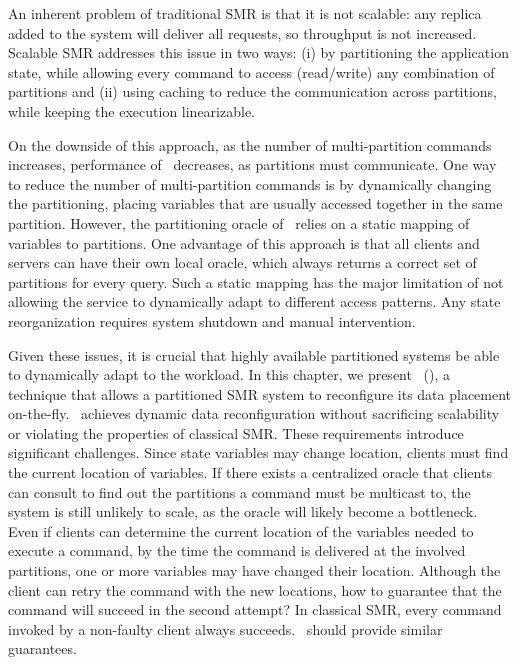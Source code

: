 
An inherent problem of traditional SMR is that it is not scalable: any replica
added to the system will deliver all requests, so throughput is not increased.
Scalable SMR addresses this issue in two ways: (i) by partitioning the
application state, while allowing every command to access (read/write) any
combination of partitions and (ii) using caching to reduce the communication
across partitions, while keeping the execution linearizable.

On the downside of this approach, as the number of multi-partition commands
increases, performance of \ssmr\ decreases, as partitions must communicate.
One way to reduce the number of multi-partition commands is by dynamically
changing the partitioning, placing variables that are usually accessed together
in the same partition. However, the partitioning oracle of \ssmr\ relies on a
static mapping of variables to partitions. One advantage of this approach
is that all clients and servers can have their own local oracle, which always
returns a correct set of partitions for every query. Such a static mapping has
the major limitation of not allowing the service to dynamically adapt to
different access patterns. Any state reorganization requires system shutdown and
manual intervention.

Given these issues, it is crucial that highly available partitioned systems be
able to dynamically adapt to the workload. In this chapter, we present
\dssmrlong\ (\dssmr), a technique that allows a partitioned SMR system to
reconfigure its data placement on-the-fly. \dssmr\ achieves dynamic data
reconfiguration without sacrificing scalability or violating the properties of
classical SMR. These requirements introduce significant challenges. Since state
variables may change location, clients must find the current location of
variables.
If there exists a centralized oracle that clients can consult to find out the
partitions a command must be multicast to, the system is still unlikely to
scale, as the oracle will likely become a bottleneck. Even if clients can
determine the current location of the variables needed to execute a command, by
the time the command is delivered at the involved partitions, one or more
variables may have changed their location. Although the client can retry the
command with the new locations, how to guarantee that the command will succeed
in the second attempt? In classical SMR, every command invoked by a non-faulty
client always succeeds. \dssmr\ should provide similar guarantees.

